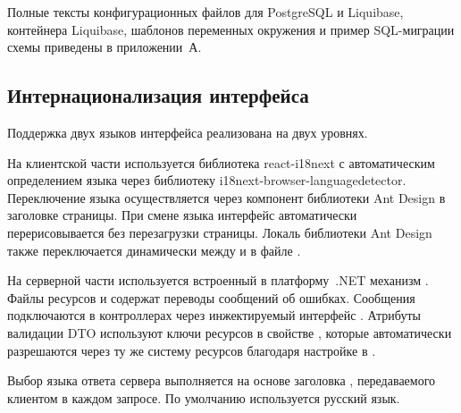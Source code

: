 Полные тексты конфигурационных файлов  для PostgreSQL и Liquibase,  контейнера Liquibase, шаблонов переменных окружения  и пример SQL-миграции схемы приведены в приложении~А.

\subsection{Интернационализация интерфейса}

Поддержка двух языков интерфейса реализована на двух уровнях.

На клиентской части используется библиотека react-i18next с автоматическим определением языка через библиотеку i18next-browser-languagedetector.
Переключение языка осуществляется через компонент  библиотеки Ant Design в заголовке страницы.
При смене языка интерфейс автоматически перерисовывается без перезагрузки страницы.
Локаль библиотеки Ant Design также переключается динамически между  и  в файле .

На серверной части используется встроенный в платформу~.NET механизм .
Файлы ресурсов  и  содержат переводы сообщений об ошибках.
Сообщения подключаются в контроллерах через инжектируемый интерфейс .
Атрибуты валидации DTO используют ключи ресурсов в свойстве , которые автоматически разрешаются через ту же систему ресурсов благодаря настройке  в .

Выбор языка ответа сервера выполняется на основе заголовка , передаваемого клиентом в каждом запросе.
По умолчанию используется русский язык.
